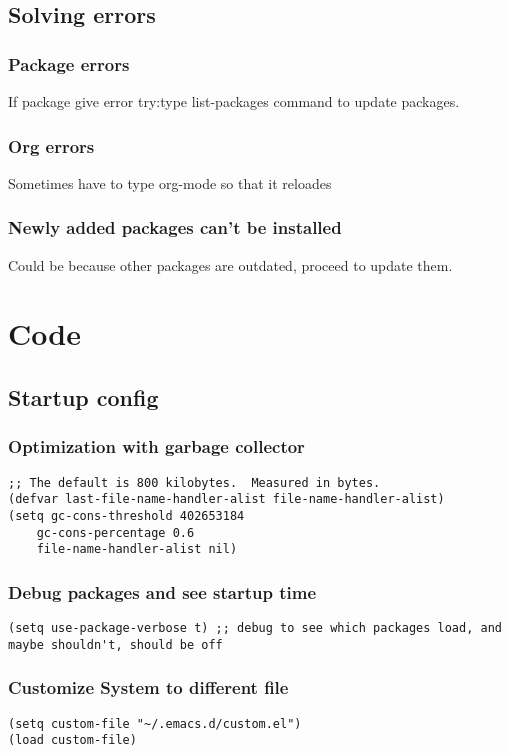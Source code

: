 \documentclass[11pt]{article}
\begin{document}
\subsection{Solving errors}
\label{sec:org87696f0}
\subsubsection{Package errors}
\label{sec:org6c5c9c6}
If package give error try:type list-packages command to update packages.
\subsubsection{Org errors}
\label{sec:orgd57f7e2}
Sometimes have to type org-mode so that it reloades
\subsubsection{Newly added packages can't be installed}
\label{sec:org0cc0868}
Could be because other packages are outdated, proceed to update them.
\section{Code}
\label{sec:org7308e8f}
\subsection{Startup config}
\label{sec:orgd77571e}
\subsubsection{Optimization with garbage collector}
\label{sec:orga0a2122}
\begin{verbatim}
;; The default is 800 kilobytes.  Measured in bytes.
(defvar last-file-name-handler-alist file-name-handler-alist)
(setq gc-cons-threshold 402653184
    gc-cons-percentage 0.6
    file-name-handler-alist nil)
\end{verbatim}

\subsubsection{Debug packages and see startup time}
\label{sec:orgc24924c}
\begin{verbatim}
(setq use-package-verbose t) ;; debug to see which packages load, and maybe shouldn't, should be off
\end{verbatim}
\subsubsection{Customize System to different file}
\label{sec:org7e8e8d1}
\begin{verbatim}
(setq custom-file "~/.emacs.d/custom.el")
(load custom-file)
\end{verbatim}
\end{document}
